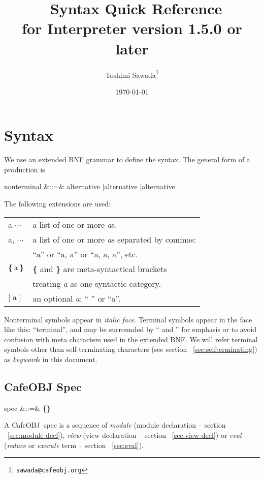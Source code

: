 \documentclass[a4paper]{article}
\title{\cafeobj\ Syntax Quick Reference \\
  {\small for Interpreter version 1.5.0 or later}}
\date{\today}
\author{Toshimi Sawada\thanks{\texttt{sawada@cafeobj.org}}
  }
\newenvironment{fminipage}%
{\begin{Sbox}\begin{minipage}}%
{\end{minipage}\end{Sbox}\fbox{\TheSbox}}
\def\cafeobj{\textsf{CafeOBJ}}
\def\sym#1{\textsf{#1}\null}
\def\nonterm#1{\textit{#1}\null}
\def\alt{{\;|\;}}
\def\seqof#1{\mbox{\textbf{\{}}\;{#1}\;\mbox{\textbf{\}}}}
\def\optn#1{\textbf{[}\;{#1}\;\textbf{]}}
\def\synindent{\;\;\;}
\begin{document}
\maketitle
\tableofcontents
%
\setlength{\parindent}{0pt}
\setlength{\parskip}{1.4ex}
\section{Syntax}
\label{sec:cafeobj-syntax}

We use an extended BNF grammar to define the syntax. The general form
of a production is
\begin{syntax}
\synindent\synindent  nonterminal &::=& alternative \alt alternative \alt \cdots \alt alternative
\end{syntax}

The following extensions are used:
\begin{center}
\begin{fminipage}{0.7\textwidth}
  \begin{tabular}{ll}
    a $\cdots$ & a list of one or more \textit{a}s. \\
    a, $\cdots$ & a list of one or more \textit{a}s separated by commas: \\
    & ``a'' or ``a, a'' or ``a, a, a'', etc. \\
    $\seqof{\textrm{a}}$ & \textbf{\{} and \textbf{\}} are meta-syntactical
    brackets \\ 
    & treating \textit{a} as one syntactic category. \\
    $\optn{\textrm{a}}$ & an optional \textit{a}: `` '' or ``a''.
  \end{tabular}
\end{fminipage}
\end{center}
Nonterminal symbols appear in \textit{italic face}. Terminal symbols
appear in the face like this: ``\sym{terminal}'', and may be
surrounded by `` and '' for emphasis or to avoid confusion
with meta characters used in the extended BNF. We will refer terminal
symbols other than self-terminating characters (see section
~\ref{sec:selfterminating}) as \textit{keyword}s in this document.

\subsection{CafeOBJ Spec}
\label{sec:cafeobjprogram}
\begin{syntax}
  \synindent\synindent spec &::=& \seqof{module \alt view \alt eval} \cdots
\end{syntax}
A \cafeobj\ spec is a sequence of \nonterm{module} (module declaration
-- section ~\ref{sec:module-decl}), \nonterm{view} (view declaration -- 
section ~\ref{sec:view-decl}) or \nonterm{eval} (\textit{reduce} or
\textit{execute} term -- section ~\ref{sec:eval}).
\end{document}
